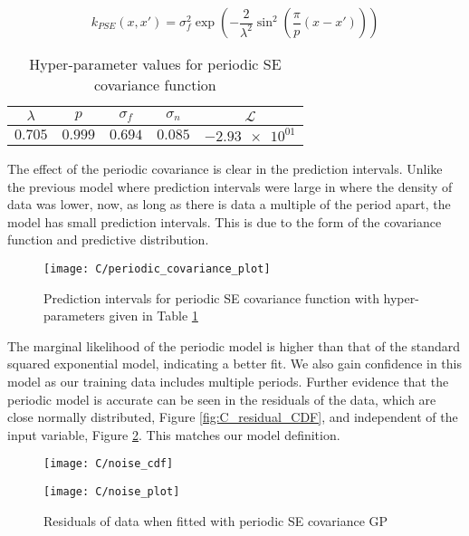\documentclass[11pt]{article}
\newcommand{\Lik}{\mathcal{L}}
\begin{document}
\begin{equation}
    k_{PSE}(x,x') = \sigma_f^2 \exp(-\frac{2}{\lambda^2}\sin^2(\frac{\pi}{p}(x-x')))
    \label{eq:PSE}
\end{equation}

\begin{table}[h]
    \centering
    \small
    \begin{tabular}{|c|c|c|c|c|}
        \hline
        $\lambda$ & $p$ & $\sigma_f$ & $\sigma_n$ & $\Lik$ \\
        \hline
        $0.705$ & $0.999$ & $0.694$ & $0.085$ & $\num{-2.93e+01}$ \\ 
        \hline
    \end{tabular}
    \caption{Hyper-parameter values for periodic SE covariance function}
    \label{table:C_periodic_covariance_hyper_parameters}
\end{table}

The effect of the periodic covariance is clear in the prediction intervals. Unlike the previous model where prediction intervals were large in where the density of data was lower, now, as long as there is data a multiple of the period apart, the model has small prediction intervals. This is due to the form of the covariance function and predictive distribution.

\begin{figure}[h]
    \centering
    \texttt{[image: C/periodic\_covariance\_plot]}
    \caption{Prediction intervals for periodic SE covariance function with hyper-parameters given in Table \ref{table:C_periodic_covariance_hyper_parameters}}
    \label{fig:C_periodic_covariance_prediction_intervals}
\end{figure}

The marginal likelihood of the periodic model is higher than that of the standard squared exponential model, indicating a better fit. We also gain confidence in this model as our training data includes multiple periods. Further evidence that the periodic model is accurate can be seen in the residuals of the data, which are close normally distributed, Figure \ref{fig:C_residual_CDF}, and independent of the input variable, Figure \ref{fig:C_residuals}. This matches our model definition.

\begin{figure}[h]
    \centering
    \begin{minipage}{0.4\textwidth}
        \centering
        \texttt{[image: C/noise\_cdf]}
        \label{fig:C_residual_CDF}
    \end{minipage}
    \begin{minipage}{0.4\textwidth}
        \centering
        \texttt{[image: C/noise\_plot]}
        \label{fig:C_residuals}
    \end{minipage}
    \caption{Residuals of data when fitted with periodic SE covariance GP}
\end{figure}
\end{document}
